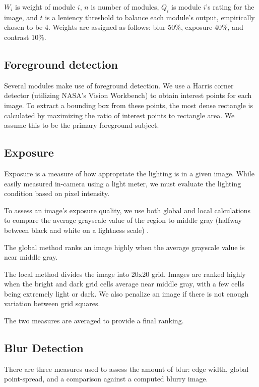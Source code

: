 \documentclass{article}
\begin{document}
\(W_i\) is weight of module \(i\), \(n\) is number of modules, \(Q_i\) is  module \(i\)'s rating for the image, and \(t\) is a leniency threshold to balance each module's output, empirically chosen to be 4. Weights are assigned as follows: blur 50\%, exposure 40\%, and contrast 10\%.

\subsection{Foreground detection}\label{ContentRecognition}
Several modules make use of foreground detection. We use a Harris corner detector\cite{Harris} (utilizing NASA's Vision Workbench\cite{vision-workbench}) to obtain interest points for each image. To extract a bounding box from these points, the most dense rectangle is calculated by maximizing the ratio of interest points to rectangle area. We assume this to be the primary foreground subject.

\subsection{Exposure}

Exposure is a measure of how appropriate the lighting is in a given image. While easily measured in-camera using a light meter, we must evaluate the lighting condition based on pixel intensity.

To assess an image's exposure quality, we use both global and local calculations to compare the average grayscale value of the region to middle gray (halfway between black and white on a lightness scale) \cite{ppr:1815}.

The global method ranks an image highly when the average grayscale value is near middle gray.

The local method divides the image into 20x20 grid. Images are ranked highly when the bright and dark grid cells average near middle gray, with a few cells being extremely light or dark. We also penalize an image if there is not enough variation between grid squares.

The two measures are averaged to provide a final ranking.

\subsection{Blur Detection}
There are three measures used to assess the amount of blur: edge width, global point-spread, and a comparison against a computed blurry image.
\end{document}
